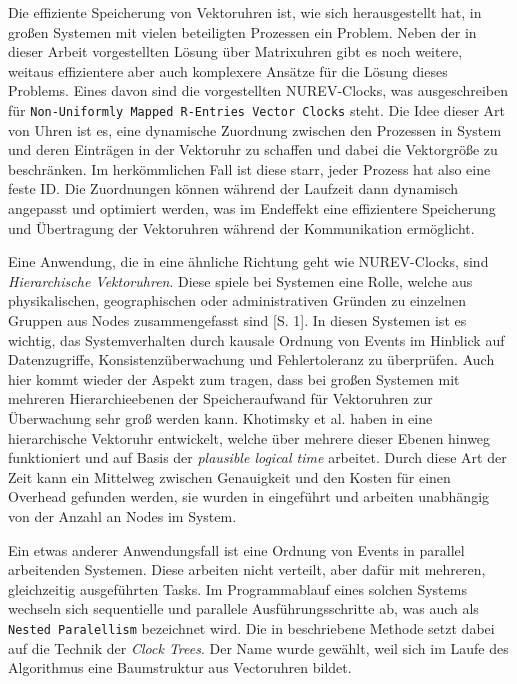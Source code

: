 Die effiziente Speicherung von Vektoruhren ist, wie sich herausgestellt hat, in großen Systemen mit vielen beteiligten Prozessen ein Problem. Neben der in dieser Arbeit vorgestellten Lösung über Matrixuhren gibt es noch weitere, weitaus effizientere aber auch komplexere Ansätze für die Lösung dieses Problems. Eines davon sind die \cite{Gidenstam2004} vorgestellten NUREV-Clocks, was ausgeschreiben für \texttt{Non-Uniformly Mapped R-Entries Vector Clocks} steht. Die Idee dieser Art von Uhren ist es, eine dynamische Zuordnung zwischen den Prozessen in System und deren Einträgen in der Vektoruhr zu schaffen und dabei die Vektorgröße zu beschränken. Im herkömmlichen Fall ist diese starr, jeder Prozess hat also eine feste ID. Die Zuordnungen können während der Laufzeit dann dynamisch angepasst und optimiert werden, was im Endeffekt eine effizientere Speicherung und Übertragung der Vektoruhren während der Kommunikation ermöglicht.

Eine Anwendung, die in eine ähnliche Richtung geht wie NUREV-Clocks, sind \textit{Hierarchische Vektoruhren}. Diese spiele bei Systemen eine Rolle, welche aus physikalischen, geographischen oder administrativen Gründen zu einzelnen Gruppen aus Nodes zusammengefasst sind \cite{Khotimsky1999}[S. 1]. In diesen Systemen ist es wichtig, das Systemverhalten durch kausale Ordnung von Events im Hinblick auf Datenzugriffe, Konsistenzüberwachung und Fehlertoleranz zu überprüfen. Auch hier kommt wieder der Aspekt zum tragen, dass bei großen Systemen mit mehreren Hierarchieebenen der Speicheraufwand für Vektoruhren zur Überwachung sehr groß werden kann. Khotimsky et al. haben in  \cite{Khotimsky1999} eine hierarchische Vektoruhr entwickelt, welche über mehrere dieser Ebenen hinweg funktioniert und auf Basis der \textit{plausible logical time} arbeitet. Durch diese Art der Zeit kann ein Mittelweg zwischen Genauigkeit und den Kosten für einen Overhead gefunden werden, sie wurden in \cite{Torres-Rojas1999} eingeführt und arbeiten unabhängig von der Anzahl an Nodes im System.

Ein etwas anderer Anwendungsfall ist eine Ordnung von Events in parallel arbeitenden Systemen. Diese arbeiten nicht verteilt, aber dafür mit mehreren, gleichzeitig ausgeführten Tasks. Im Programmablauf eines solchen Systems wechseln sich sequentielle und parallele Ausführungsschritte ab, was auch als \texttt{Nested Paralellism} bezeichnet wird. Die in \cite{Audenaert1997} beschriebene Methode setzt dabei auf die Technik der \textit{Clock Trees}. Der Name wurde gewählt, weil sich im Laufe des Algorithmus eine Baumstruktur aus Vectoruhren bildet.


